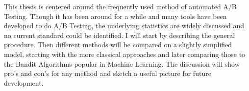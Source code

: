 \documentclass[main.tex]{subfiles}
\begin{document}
This thesis is centered around the frequently used method of automated A/B Testing. Though it has been around for a while and many tools have been developed to do A/B Testing, the underlying statistics are widely discussed and no current standard could be identified. I will start by describing the general procedure.  Then different methods will be compared on a slightly simplified model, starting with the more classical approaches and later comparing those to the Bandit Algorithms popular in Machine Learning. The discussion will show pro's and con's for any method and sketch a useful picture for future development.
\end{document}
